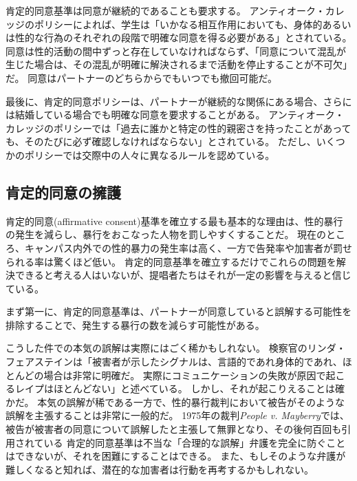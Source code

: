\documentclass[paper=a4,book,openany]{jlreq}
\newcommand{\ig}[1]{}           %
\begin{document}
肯定的同意基準は同意が継続的であることも要求する。
アンティオーク・カレッジのポリシーによれば、学生は「いかなる相互作用においても、身体的あるいは性的な行為のそれぞれの段階で明確な同意を得る必要がある」とされている\ig{\footnote{Antioch College.}}。
同意は性的活動の間中ずっと存在していなければならず、「同意について混乱が生じた場合は、その混乱が明確に解決されるまで活動を停止することが不可欠」だ。
同意はパートナーのどちらからでもいつでも撤回可能だ\ig{\footnote{Antioch College.}}。

最後に、肯定的同意ポリシーは、パートナーが継続的な関係にある場合、さらには結婚している場合でも明確な同意を要求することがある。
アンティオーク・カレッジのポリシーでは「過去に誰かと特定の性的親密さを持ったことがあっても、そのたびに必ず確認しなければならない」とされている。
ただし、いくつかのポリシーでは交際中の人々に異なるルールを認めている。

\subsection{肯定的同意の擁護}

肯定的同意(affirmative consent)基準を確立する最も基本的な理由は、性的暴行の発生を減らし、暴行をおこなった人物を罰しやすくすることだ。
現在のところ、キャンパス内外での性的暴力の発生率は高く、一方で告発率や加害者が罰せられる率は驚くほど低い。
肯定的同意基準を確立するだけでこれらの問題を解決できると考える人はいないが、提唱者たちはそれが一定の影響を与えると信じている。

まず第一に、肯定的同意基準は、パートナーが同意していると誤解する可能性を排除することで、発生する暴行の数を減らす可能性がある。

こうした件での本気の誤解は実際にはごく稀かもしれない。
検察官のリンダ・フェアステイン\ig{Linda Fairstein}は「被害者が示したシグナルは、言語的であれ身体的であれ、ほとんどの場合は非常に明確だ。
実際にコミュニケーションの失敗が原因で起こるレイプはほとんどない」と述べている\citep{fairstein94:_panel_discus_men_women_rape}。
しかし、それが起こりえることは確かだ。
本気の誤解が稀である一方で、性的暴行裁判において被告がそのような誤解を主張することは非常に一般的だ。
1975年の裁判\emph{People v. Mayberry}では、被告が被害者の同意について誤解したと主張して無罪となり、その後何百回も引用されている
肯定的同意基準は不当な「合理的な誤解」弁護を完全に防ぐことはできないが、それを困難にすることはできる。
また、もしそのような弁護が難しくなると知れば、潜在的な加害者は行動を再考するかもしれない。
\end{document}
